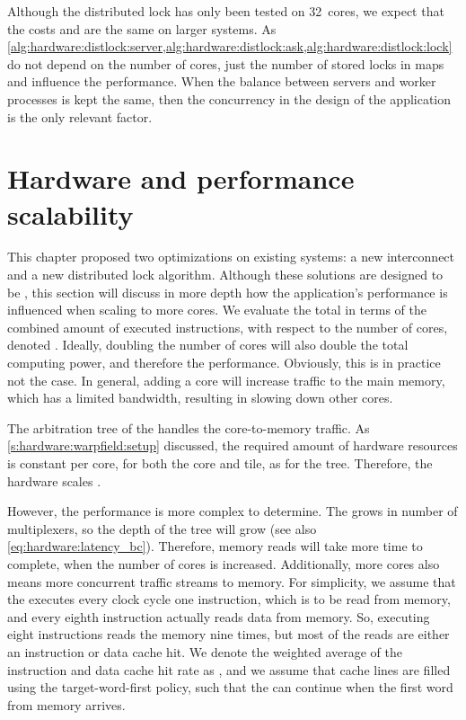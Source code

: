 Although the distributed lock has only been tested on 32~cores, we expect that the costs and  are the same on larger systems.
As \cref{alg:hardware:distlock:server,alg:hardware:distlock:ask,alg:hardware:distlock:lock} do not depend on the number of cores, just the number of stored locks in maps \SYMservermap and \SYMlockset[\SYMproc] influence the performance.
When the balance between servers and worker processes is kept the same, then the concurrency in the design of the application is the only relevant factor.


\section{Hardware and performance scalability}
\label{s:hardware:scalability}

This chapter proposed two optimizations on existing systems: a new interconnect and a new distributed lock algorithm.
Although these solutions are designed to be , this section will discuss in more depth how the application's performance is influenced when scaling to more cores.
We evaluate the total  in terms of the combined amount of executed instructions, with respect to the number of cores, denoted \SYMcorecount*.
Ideally, doubling the number of cores will also double the total computing power, and therefore the performance.
Obviously, this is in practice not the case.
In general, adding a core will increase traffic to the main memory, which has a limited bandwidth, resulting in slowing down other cores.

The arbitration tree of the \Warpfield* {} handles the core-to-memory traffic.
As \cref{s:hardware:warpfield:setup} discussed, the required amount of hardware resources is constant per core, for both the core and tile, as for the tree.
Therefore, the hardware scales \SYMbound[\SYMcorecount].

However, the performance is more complex to determine.
The  grows in number of multiplexers, so the depth of the tree will grow \SYMbound[\log\SYMcorecount] (see also \cref{eq:hardware:latency_bc}).
Therefore, memory reads will take more time to complete, when the number of cores is increased.
Additionally, more cores also means more concurrent traffic streams to memory.
For simplicity, we assume that the \MicroBlaze* executes every clock cycle one instruction, which is to be read from memory, and every eighth instruction actually reads data from memory.
So, executing eight instructions reads the memory nine times, but most of the reads are either an instruction or data cache hit.
We denote the weighted average of the instruction and data cache hit rate as \SYMhitrate*, and we assume that cache lines are filled using the target-word-first policy, such that the \MicroBlaze can continue when the first word from memory arrives.

